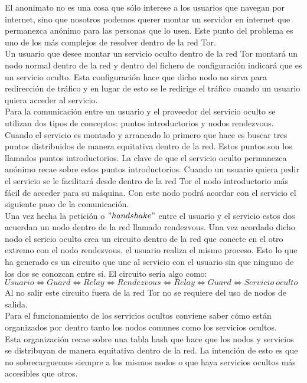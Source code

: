 El anonimato no es una cosa que sólo interese a los usuarios que navegan por internet, sino que nosotros podemos querer montar un servidor en internet que permanezca anónimo para las personas que lo usen. Este punto del problema es uno de los más complejos de resolver dentro de la red Tor.\\
Un usuario que desee montar un servicio oculto dentro de la red Tor montará un nodo normal dentro de la red y dentro del fichero de configuración indicará que es un servicio oculto. Esta configuración hace que dicho nodo no sirva para redirección de tráfico y en lugar de esto se le redirige el tráfico cuando un usuario quiera acceder al servicio.\\
Para la comunicación entre un usuario y el proveedor del servicio oculto se utilizan dos tipos de conceptos: puntos introductorios y nodos rendezvous.\\
Cuando el servicio es montado y arrancado lo primero que hace es buscar tres puntos distribuidos de manera equitativa dentro de la red. Estos puntos son los llamados puntos introductorios. La clave de que el servicio oculto permanezca anónimo recae sobre estos puntos introductorios. Cuando un usuario quiera pedir el servicio se le facilitará desde dentro de la red Tor el nodo introductorio más fácil de acceder para su máquina. Con este nodo podrá acordar con el servicio el siguiente paso de la comunicación.\\
Una vez hecha la petición o $"handshake"$ entre el usuario y el servicio estos dos acuerdan un nodo dentro de la red llamado rendezvous. Una vez acordado dicho nodo el sericio oculto crea un circuito dentro de la red que conecte en el otro extremo con el nodo rendezvous, el usuario realiza el mismo proceso. Esto lo que ha generado es un circuito que une al servicio con el usuario sin que ninguno de los dos se conozcan entre sí. El circuito sería algo como:\\ 
$Usuario\Leftrightarrow Guard\Leftrightarrow Relay\Leftrightarrow Rendezvous\Leftrightarrow Relay\Leftrightarrow Guard \Leftrightarrow Servicio \ oculto$\\
Al no salir este circuito fuera de la red Tor no se requiere del uso de nodos de salida.\\
Para el funcionamiento de los servicios ocultos conviene saber cómo están organizados por dentro tanto los nodos comunes como los servicios ocultos.\\
Esta organización recae sobre una tabla hash que hace que los nodos y servicios se distribuyan de manera equitativa dentro de la red. La intención de esto es que no sobrecarguemos siempre a los mismos nodos o que haya servicios ocultos más accesibles que otros.
